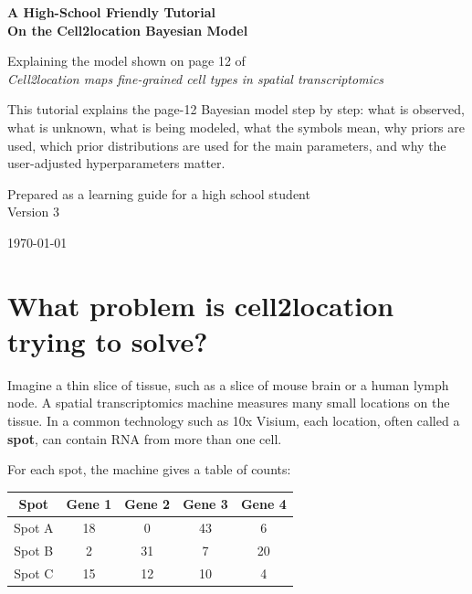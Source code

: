 \documentclass[11pt]{article}
\newcommand{\term}[1]{\textbf{#1}}
\begin{document}
\begin{titlepage}
\centering
\vspace*{0.5in}
{\Huge\bfseries A High-School Friendly Tutorial\\[0.3em]
On the Cell2location Bayesian Model\par}
\vspace{0.35in}
{\Large Explaining the model shown on page 12 of\\
\emph{Cell2location maps fine-grained cell types in spatial transcriptomics}\par}
\vspace{0.55in}
\begin{tcolorbox}[colback=softblue,colframe=deepblue,width=0.88\textwidth,arc=2mm]
\large
This tutorial explains the page-12 Bayesian model step by step: what is observed, what is unknown, what is being modeled, what the symbols mean, why priors are used, which prior distributions are used for the main parameters, and why the user-adjusted hyperparameters matter.
\end{tcolorbox}
\vfill
{\large Prepared as a learning guide for a high school student\\Version 3}\par
\vspace{0.3in}
{\large \today}\par
\end{titlepage}

\tableofcontents
\newpage

\section{What problem is cell2location trying to solve?}

Imagine a thin slice of tissue, such as a slice of mouse brain or a human lymph node. A spatial transcriptomics machine measures many small locations on the tissue. In a common technology such as 10x Visium, each location, often called a \term{spot}, can contain RNA from more than one cell.

For each spot, the machine gives a table of counts:

\begin{center}
\begin{tabular}{c|cccc}
\toprule
Spot & Gene 1 & Gene 2 & Gene 3 & Gene 4 \\
\midrule
Spot A & 18 & 0 & 43 & 6 \\
Spot B & 2 & 31 & 7 & 20 \\
Spot C & 15 & 12 & 10 & 4 \\
\bottomrule
\end{tabular}
\end{center}
\end{document}
